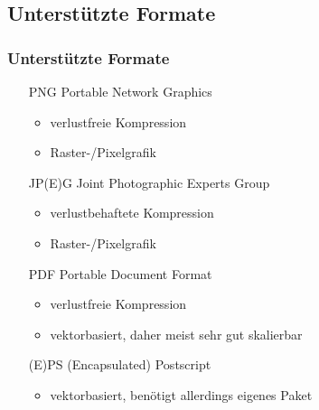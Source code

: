 \documentclass{beamer}
\begin{document}
\subsection{Unterstützte Formate}
\begin{frame}
\frametitle{Unterstützte Formate}
  \begin{itemize}
    \item[PNG] Portable Network Graphics
    \begin{itemize}
      \item verlustfreie Kompression
      \item Raster-/Pixelgrafik
    \end{itemize}
    \item[JP(E)G] Joint Photographic Experts Group
    \begin{itemize}
      \item verlustbehaftete Kompression
      \item Raster-/Pixelgrafik
    \end{itemize}
    \item[PDF] Portable Document Format
    \begin{itemize}
      \item verlustfreie Kompression
      \item vektorbasiert, daher meist sehr gut skalierbar
    \end{itemize}
    \item[(E)PS] (Encapsulated) Postscript
    \begin{itemize}
      \item vektorbasiert, benötigt allerdings eigenes Paket
    \end{itemize}
  \end{itemize}
\end{frame}
% 
\end{document}
